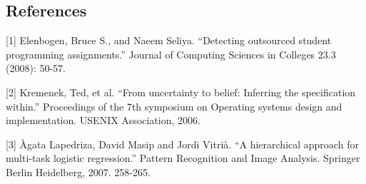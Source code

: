 \subsection*{References}

\small{
[1] Elenbogen, Bruce S., and Naeem Seliya. 
``Detecting outsourced student programming assignments.'' 
Journal of Computing Sciences in Colleges 23.3 (2008): 50-57.

[2] Kremenek, Ted, et al. 
``From uncertainty to belief: Inferring the specification within.'' 
Proceedings of the 7th symposium on Operating systems design and implementation. USENIX Association, 2006.

[3] {\`A}gata Lapedriza, David Masip and Jordi Vitri{\`a}.
``A hierarchical approach for multi-task logistic regression.'' 
Pattern Recognition and Image Analysis. Springer Berlin Heidelberg, 2007. 258-265.
}

